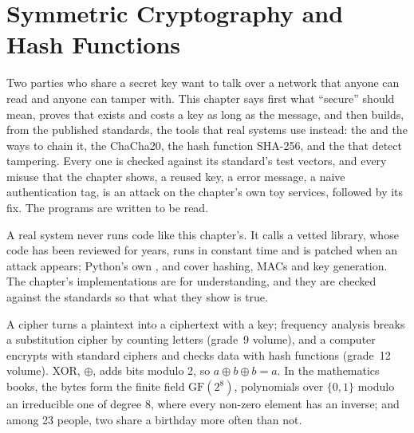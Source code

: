\chapter{Symmetric Cryptography and Hash Functions}\label{ch:b3:symmetric-cryptography}

Two parties who share a secret key want to talk over a network that anyone can read and anyone can tamper with. This chapter says first what ``secure'' should mean, proves that  exists and costs a key as long as the message, and then builds, from the published standards, the tools that real systems use instead: the   and the ways to chain it, the  ChaCha20, the hash function SHA-256, and the  that detect tampering. Every one is checked against its standard's test vectors, and every misuse that the chapter shows, a reused key, a  error message, a naive authentication tag, is an attack on the chapter's own toy services, followed by its fix. The programs are written to be read.

\begin{inpractice}
A real system never runs code like this chapter's. It calls a vetted library, whose code has been reviewed for years, runs in constant time and is patched when an attack appears; Python's own ,  and  cover hashing, MACs and key generation. The chapter's implementations are for understanding, and they are checked against the standards so that what they show is true.
\end{inpractice}

\begin{recall}
A cipher turns a plaintext into a ciphertext with a key; frequency analysis breaks a substitution cipher by counting letters (grade~9 volume), and a computer encrypts with standard ciphers and checks data with hash functions (grade~12 volume). XOR, $\oplus$, adds bits modulo 2, so $a \oplus b \oplus b = a$. In the mathematics books, the bytes form the finite field $\mathrm{GF}(2^8)$, polynomials over $\{0, 1\}$ modulo an irreducible one of degree 8, where every non-zero element has an inverse; and among 23 people, two share a birthday more often than not.
\end{recall}

